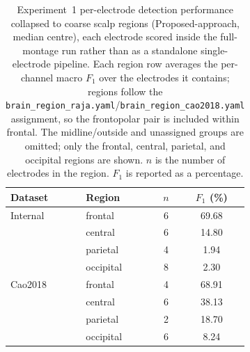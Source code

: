 \begin{table}[ht]
  \centering
  \caption{Experiment~1 per-electrode detection performance collapsed to coarse scalp regions (Proposed-approach, median centre), each electrode scored inside the full-montage run rather than as a standalone single-electrode pipeline. Each region row averages the per-channel macro $F_1$ over the electrodes it contains; regions follow the \texttt{brain\_region\_raja.yaml}/\texttt{brain\_region\_cao2018.yaml} assignment, so the frontopolar pair is included within frontal. The midline/outside and unassigned groups are omitted; only the frontal, central, parietal, and occipital regions are shown. $n$ is the number of electrodes in the region. $F_1$ is reported as a percentage.}
  \label{tab:region_performance}
  \begin{tabular}{llcc}
    \toprule
    Dataset & Region & $n$ & $F_1$ (\%) \\
    \midrule
    Internal & frontal & 6 & 69.68 \\
     & central & 6 & 14.80 \\
     & parietal & 4 & 1.94 \\
     & occipital & 8 & 2.30 \\
    \midrule
    Cao2018 & frontal & 4 & 68.91 \\
     & central & 6 & 38.13 \\
     & parietal & 2 & 18.70 \\
     & occipital & 6 & 8.24 \\
    \bottomrule
  \end{tabular}
\end{table}
